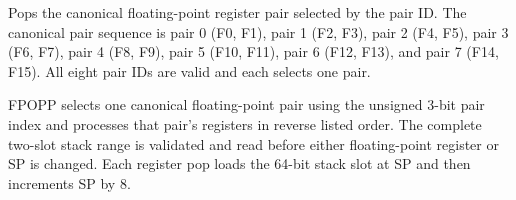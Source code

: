 Pops the canonical floating-point register pair selected by the pair ID. The canonical pair sequence is pair 0 (F0, F1), pair 1 (F2, F3), pair 2 (F4, F5), pair 3 (F6, F7), pair 4 (F8, F9), pair 5 (F10, F11), pair 6 (F12, F13), and pair 7 (F14, F15). All eight pair IDs are valid and each selects one pair.

FPOPP selects one canonical floating-point pair using the unsigned 3-bit pair index and processes that pair's registers in reverse listed order. The complete two-slot stack range is validated and read before either floating-point register or SP is changed. Each register pop loads the 64-bit stack slot at SP and then increments SP by 8.
